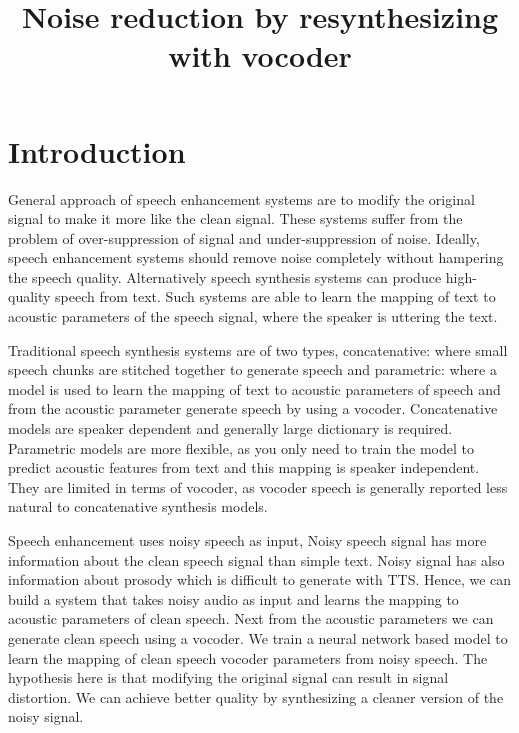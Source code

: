 \documentclass{article}
\title{Noise reduction by resynthesizing with vocoder}
\begin{document}
%
\maketitle
%
\begin{abstract}

\end{abstract}
%
\begin{keywords}
\end{keywords}
%

\section{Introduction}
\label{sec:intro}
General approach of speech enhancement systems are to modify the original signal to make it more like the clean signal. These systems suffer from the problem of over-suppression of signal and under-suppression of noise.   Ideally, speech enhancement systems should remove noise completely without hampering the speech quality. Alternatively speech synthesis systems can produce high-quality speech from text. Such systems are able to learn the mapping of text to acoustic parameters of the speech signal, where the speaker is uttering the text. 

Traditional speech synthesis systems are of two types, concatenative: where small speech chunks are stitched together to generate speech and parametric: where a model is used to learn the mapping of text to acoustic parameters of speech  and from the acoustic parameter generate speech by using a vocoder. Concatenative models are speaker dependent and generally large dictionary is required. Parametric models are more flexible, as you only need to train the model to predict acoustic features from text and this mapping is speaker independent. They are limited in terms of vocoder, as vocoder speech is generally reported less natural to concatenative synthesis models. 

Speech enhancement uses noisy speech as input, Noisy speech signal has more information about the clean speech signal than simple text. Noisy signal has also information about prosody which is difficult to generate with TTS. Hence, we can build a system that takes noisy audio as input and learns the mapping to acoustic parameters of clean speech. Next from the acoustic parameters we can generate clean speech using a vocoder. We train a neural network based model to learn the mapping of clean speech vocoder parameters from noisy speech. The hypothesis here is that modifying the original signal can result in signal distortion. We can achieve better quality by synthesizing a cleaner version of the noisy signal. 
\end{document}
